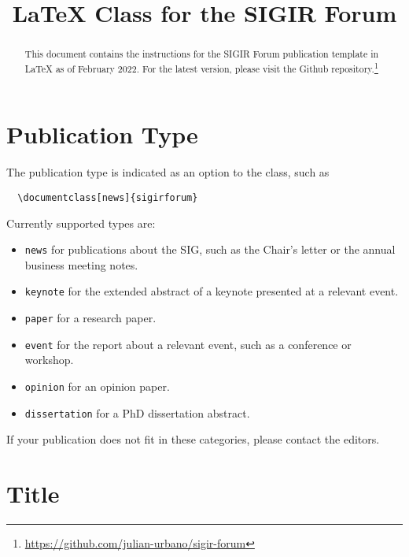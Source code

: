 \documentclass[news]{sigirforum}
\begin{document}
\title{\LaTeX\xspace Class for the SIGIR Forum}


\maketitle 
\begin{abstract}
This document contains the instructions for the SIGIR Forum publication template in \LaTeX\xspace as of February 2022. For the latest version, please visit the Github repository.\footnote{\url{https://github.com/julian-urbano/sigir-forum}}
\end{abstract}

\section{Publication Type}

The publication type is indicated as an option to the class, such as
\begin{verbatim}
  \documentclass[news]{sigirforum}
\end{verbatim}
Currently supported types are:
\begin{itemize}
	\item \texttt{news} for publications about the SIG, such as the Chair's letter or the annual business meeting notes.
	\item \texttt{keynote} for the extended abstract of a keynote presented at a relevant event.
	\item \texttt{paper} for a research paper.
	\item \texttt{event} for the report about a relevant event, such as a conference or workshop.
	\item \texttt{opinion} for an opinion paper.
	\item \texttt{dissertation} for a PhD dissertation abstract.
\end{itemize}

If your publication does not fit in these categories, please contact the editors.

\section{Title}
\end{document}
